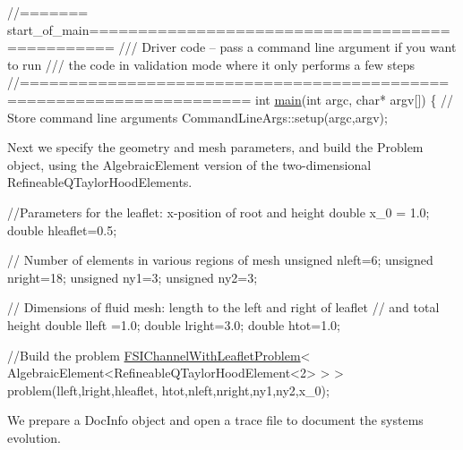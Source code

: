 \begin{DoxyCodeInclude}
\textcolor{comment}{//======= start\_of\_main================================================}
\textcolor{comment}{/// Driver code  -- pass a command line argument if you want to run}
\textcolor{comment}{}\textcolor{comment}{/// the code in validation mode where it only performs a few steps}
\textcolor{comment}{}\textcolor{comment}{//=====================================================================}
\textcolor{keywordtype}{int} \hyperlink{fsi__channel__with__leaflet_8cc_a0ddf1224851353fc92bfbff6f499fa97}{main}(\textcolor{keywordtype}{int} argc, \textcolor{keywordtype}{char}* argv[])
\{
 \textcolor{comment}{// Store command line arguments}
 CommandLineArgs::setup(argc,argv);

\end{DoxyCodeInclude}


Next we specify the geometry and mesh parameters, and build the {\ttfamily Problem} object, using the {\ttfamily Algebraic\+Element} version of the two-\/dimensional {\ttfamily Refineable\+Q\+Taylor\+Hood\+Elements}.


\begin{DoxyCodeInclude}

 \textcolor{comment}{//Parameters for the leaflet: x-position of root and height}
 \textcolor{keywordtype}{double} x\_0 = 1.0; 
 \textcolor{keywordtype}{double} hleaflet=0.5;

 \textcolor{comment}{// Number of elements in various regions of mesh}
 \textcolor{keywordtype}{unsigned} nleft=6; 
 \textcolor{keywordtype}{unsigned} nright=18;
 \textcolor{keywordtype}{unsigned} ny1=3; 
 \textcolor{keywordtype}{unsigned} ny2=3; 

 \textcolor{comment}{// Dimensions of fluid mesh: length to the left and right of leaflet}
 \textcolor{comment}{// and total height}
 \textcolor{keywordtype}{double} lleft =1.0; 
 \textcolor{keywordtype}{double} lright=3.0; 
 \textcolor{keywordtype}{double} htot=1.0;
  
 \textcolor{comment}{//Build the problem}
 \hyperlink{classFSIChannelWithLeafletProblem}{FSIChannelWithLeafletProblem}<
  AlgebraicElement<RefineableQTaylorHoodElement<2> > >
  problem(lleft,lright,hleaflet,
          htot,nleft,nright,ny1,ny2,x\_0); 

\end{DoxyCodeInclude}


We prepare a {\ttfamily Doc\+Info} object and open a trace file to document the system\textquotesingle{}s evolution.


